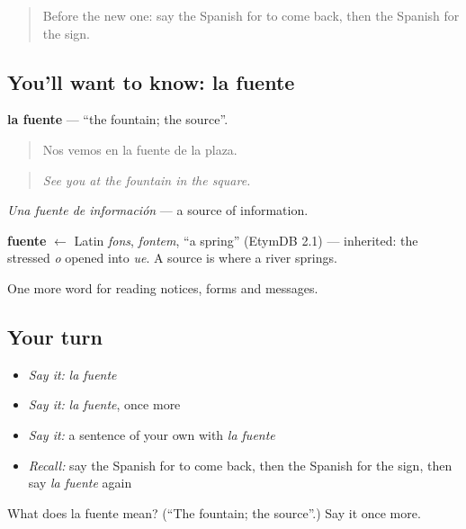 \label{lesson:ES-C501-fuente}



\begin{quote}
Before the new one: say the Spanish for to come back, then the Spanish for the sign.
\end{quote}

\subsection*{You'll want to know: la fuente}
\textbf{la fuente} — \textquotedblleft{}the fountain; the source\textquotedblright{}.

\begin{quote}
Nos vemos en la fuente de la plaza.
\end{quote}

\begin{quote}
\emph{See you at the fountain in the square.}
\end{quote}

\emph{Una fuente de información} — a source of information.

\begin{cousinweb}
\textbf{fuente} $\leftarrow$ Latin \emph{fons}, \emph{fontem}, \textquotedblleft{}a spring\textquotedblright{} (EtymDB 2.1) — inherited: the stressed \emph{o} opened into \emph{ue}. A source is where a river springs.
\end{cousinweb}

\begin{grammarlens}[title={What you've built}]
One more word for reading notices, forms and messages.
\end{grammarlens}

\subsection*{Your turn}
\begin{itemize}
\raggedright
  \item \emph{Say it:} \emph{la fuente}
  \item \emph{Say it:} \emph{la fuente}, once more
  \item \emph{Say it:} a sentence of your own with \emph{la fuente}
  \item \emph{Recall:} say the Spanish for to come back, then the Spanish for the sign, then say \emph{la fuente} again
\end{itemize}

\begin{tcolorbox}[breakable,colback=teal!4,colframe=teal!35!black,title={Before you move on}]
What does la fuente mean? (\textquotedblleft{}The fountain; the source\textquotedblright{}.) Say it once more.
\end{tcolorbox}

